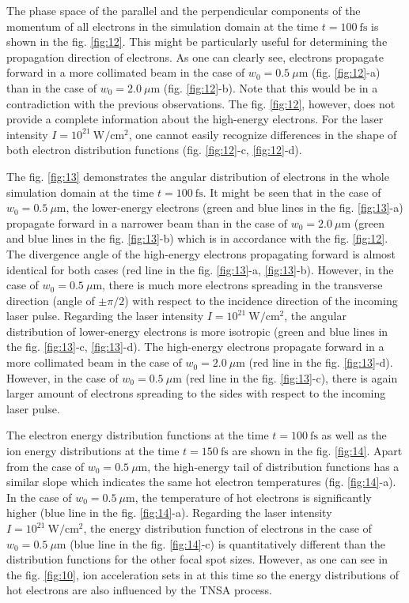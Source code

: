The phase space of the parallel and the perpendicular components of the momentum of all electrons in the simulation domain at the time $ t = 100 \ \mathrm{fs} $ is shown in the fig. \ref{fig:12}. This might be particularly useful for determining the propagation direction of electrons. As one can clearly see, electrons propagate forward in a more collimated beam in the case of $ w_0 = 0.5 \ \mu\mathrm{m} $ (fig. \ref{fig:12}-a) than in the case of $ w_0 = 2.0 \ \mu\mathrm{m} $ (fig. \ref{fig:12}-b). Note that this would be in a contradiction with the previous observations. The fig. \ref{fig:12}, however, does not provide a complete information about the high-energy electrons. For the laser intensity $ I = 10^{21} \ \mathrm{W/cm^2} $, one cannot easily recognize differences in the shape of both electron distribution functions (fig. \ref{fig:12}-c, \ref{fig:12}-d).

The fig. \ref{fig:13} demonstrates the angular distribution of electrons in the whole simulation domain at the time $ t = 100 \ \mathrm{fs} $. It might be seen that in the case of $ w_0 = 0.5 \ \mu\mathrm{m} $, the lower-energy electrons (green and blue lines in the fig. \ref{fig:13}-a) propagate forward in a narrower beam than in the case of $ w_0 = 2.0 \ \mu\mathrm{m} $ (green and blue lines in the fig. \ref{fig:13}-b) which is in accordance with the fig. \ref{fig:12}. The divergence angle of the high-energy electrons propagating forward is almost identical for both cases (red line in the fig. \ref{fig:13}-a, \ref{fig:13}-b). However, in the case of $ w_0 = 0.5 \ \mu\mathrm{m} $, there is much more electrons spreading in the transverse direction (angle of $ \pm \pi/2 $) with respect to the incidence direction of the incoming laser pulse. Regarding the laser intensity $ I = 10^{21} \ \mathrm{W/cm^2} $, the angular distribution of lower-energy electrons is more isotropic (green and blue lines in the fig. \ref{fig:13}-c, \ref{fig:13}-d). The high-energy electrons propagate forward in a more collimated beam in the case of $ w_0 = 2.0 \ \mu\mathrm{m} $ (red line in the fig. \ref{fig:13}-d). However, in the case of $ w_0 = 0.5 \ \mu\mathrm{m} $ (red line in the fig. \ref{fig:13}-c), there is again larger amount of electrons spreading to the sides with respect to the incoming laser pulse.

The electron energy distribution functions at the time $ t = 100 \ \mathrm{fs} $ as well as the ion energy distributions at the time $ t = 150 \ \mathrm{fs} $ are shown in the fig. \ref{fig:14}. Apart from the case of $ w_0 = 0.5 \ \mu\mathrm{m} $, the high-energy tail of distribution functions has a similar slope which indicates the same hot electron temperatures (fig. \ref{fig:14}-a). In the case of $ w_0 = 0.5 \ \mu\mathrm{m} $, the temperature of hot electrons is significantly higher (blue line in the fig. \ref{fig:14}-a). Regarding the laser intensity $ I = 10^{21} \ \mathrm{W/cm^2} $, the energy distribution function of electrons in the case of $ w_0 = 0.5 \ \mu\mathrm{m} $ (blue line in the fig. \ref{fig:14}-c) is quantitatively different than the distribution functions for the other focal spot sizes. However, as one can see in the fig. \ref{fig:10}, ion acceleration sets in at this time so the energy distributions of hot electrons are also influenced by the TNSA process.

